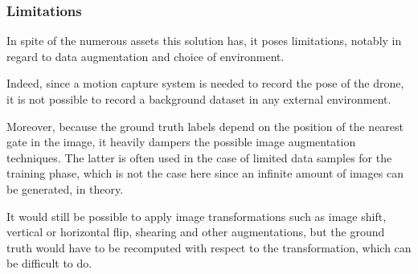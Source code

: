 	\subsubsection{Limitations}

In spite of the numerous assets this solution has, it poses limitations,
notably in regard to data augmentation and choice of environment.

Indeed, since a motion capture system is needed to record the pose of the
drone, it is not possible to record a background dataset in any external
environment.

Moreover, because the ground truth labels depend on the position of the nearest
gate in the image, it heavily dampers the possible image augmentation
techniques. The latter is often used in the case of limited data samples for
the training phase, which is not the case here since an infinite amount of
images can be generated, in theory.

It would still be possible to apply image transformations such as image shift,
vertical or horizontal flip, shearing and other augmentations, but the ground
truth would have to be recomputed with respect to the transformation, which can
be difficult to do.
